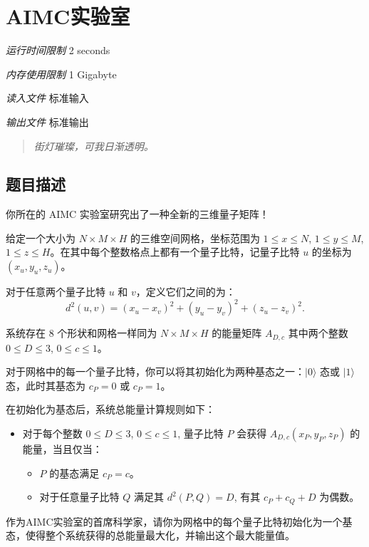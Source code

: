 \section[B. AIMC实验室]{ AIMC实验室}

\textit{运行时间限制}   2 seconds

\textit{内存使用限制} 1 Gigabyte

\textit{读入文件} \qquad 标准输入

\textit{输出文件} \qquad 标准输出


\begin{quote}
	\textit{街灯璀璨，可我日渐透明。}
\end{quote}

\subsection{题目描述}

你所在的 AIMC 实验室研究出了一种全新的三维量子矩阵！

给定一个大小为 $N \times M \times H$ 的三维空间网格，坐标范围为 $1 \le x \le N$, $1 \le y \le M$, $1 \le z \le H$。在其中每个整数格点上都有一个量子比特，记量子比特 $u$ 的坐标为 $(x_u, y_u, z_u)$。

对于任意两个量子比特 $u$ 和 $v$，定义它们之间的为：
$$
d^2(u, v) = (x_u - x_v)^2 + (y_u - y_v)^2 + (z_u - z_v)^2.
$$

系统存在 $8$ 个形状和网格一样同为 $N \times M \times H$ 的能量矩阵 $A_{D, c}$ 其中两个整数 $0 \le D \le 3$, $0 \le c \le 1$。

对于网格中的每一个量子比特，你可以将其初始化为两种基态之一：$|0\rangle$ 态或 $|1\rangle$ 态，此时其基态为 $c_P = 0$ 或 $c_P = 1$。

在初始化为基态后，系统总能量计算规则如下：

\begin{itemize}
	\item 对于每个整数 $0 \le D \le 3$, $0 \le c \le 1$, 量子比特 $P$ 会获得 $A_{D, c}(x_P, y_P, z_P)$ 的能量，当且仅当：
	\begin{itemize}
		\item $P$ 的基态满足 $c_P = c$。
		\item 对于任意量子比特 $Q$ 满足其 $d^2(P, Q) = D$, 有其 $c_P + c_Q + D$ 为偶数。
	\end{itemize}
\end{itemize}

作为AIMC实验室的首席科学家，请你为网格中的每个量子比特初始化为一个基态，使得整个系统获得的总能量最大化，并输出这个最大能量值。

